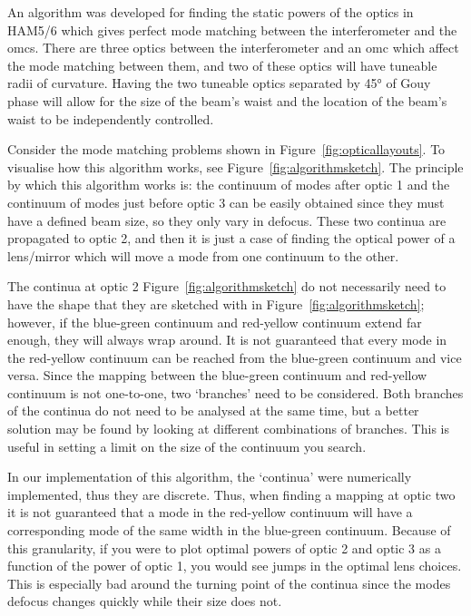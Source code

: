 \label{sec:algorithm_principle}
An algorithm was developed for finding the static powers of the optics in HAM5/6 which gives perfect mode matching between the interferometer and the \glspl{omc}. There are three optics between the interferometer and an \gls{omc} which affect the mode matching between them, and two of these optics will have tuneable radii of curvature. Having the two tuneable optics separated by \ang{45} of Gouy phase will allow for the size of the beam's waist and the location of the beam's waist to be independently controlled.
\par
Consider the mode matching problems shown in Figure~\ref{fig:opticallayouts}. To visualise how this algorithm works, see Figure~\ref{fig:algorithmsketch}. The principle by which this algorithm works is: the continuum of modes after optic 1 and the continuum of modes just before optic 3 can be easily obtained since they must have a defined beam size, so they only vary in defocus. These two continua are propagated to optic 2, and then it is just a case of finding the optical power of a lens/mirror which will move a mode from one continuum to the other.
\par
The continua at optic 2 Figure~\ref{fig:algorithmsketch} do not necessarily need to have the shape that they are sketched with in Figure~\ref{fig:algorithmsketch}; however, if the blue-green continuum and red-yellow continuum extend far enough, they will always wrap around. It is not guaranteed that every mode in the red-yellow continuum can be reached from the blue-green continuum and vice versa. Since the mapping between the blue-green continuum and red-yellow continuum is not one-to-one, two `branches' need to be considered. Both branches of the continua do not need to be analysed at the same time, but a better solution may be found by looking at different combinations of branches. This is useful in setting a limit on the size of the continuum you search.
\par
In our implementation of this algorithm, the `continua' were numerically implemented, thus they are discrete. Thus, when finding a mapping at optic two it is not guaranteed that a mode in the red-yellow continuum will have a corresponding mode of the same width in the blue-green continuum. Because of this granularity, if you were to plot optimal powers of optic 2 and optic 3 as a function of the power of optic 1, you would see jumps in the optimal lens choices. This is especially bad around the turning point of the continua since the modes defocus changes quickly while their size does not. 
